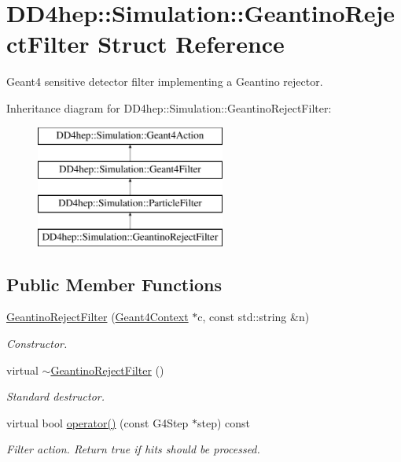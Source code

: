 \hypertarget{struct_d_d4hep_1_1_simulation_1_1_geantino_reject_filter}{}\section{D\+D4hep\+:\+:Simulation\+:\+:Geantino\+Reject\+Filter Struct Reference}
\label{struct_d_d4hep_1_1_simulation_1_1_geantino_reject_filter}


Geant4 sensitive detector filter implementing a Geantino rejector.  


Inheritance diagram for D\+D4hep\+:\+:Simulation\+:\+:Geantino\+Reject\+Filter\+:\begin{figure}[H]
\begin{center}
\leavevmode
\includegraphics[height=4.000000cm]{struct_d_d4hep_1_1_simulation_1_1_geantino_reject_filter}
\end{center}
\end{figure}
\subsection*{Public Member Functions}
\begin{DoxyCompactItemize}
\item 
\hyperlink{struct_d_d4hep_1_1_simulation_1_1_geantino_reject_filter_a1c59ff0c23002a3c6325c3ba74c92f35}{Geantino\+Reject\+Filter} (\hyperlink{class_d_d4hep_1_1_simulation_1_1_geant4_context}{Geant4\+Context} $\ast$c, const std\+::string \&n)
\begin{DoxyCompactList}\small\item\em Constructor. \end{DoxyCompactList}\item 
virtual \hyperlink{struct_d_d4hep_1_1_simulation_1_1_geantino_reject_filter_a566d0c7a2368a3358c321279be8ac3ae}{$\sim$\+Geantino\+Reject\+Filter} ()
\begin{DoxyCompactList}\small\item\em Standard destructor. \end{DoxyCompactList}\item 
virtual bool \hyperlink{struct_d_d4hep_1_1_simulation_1_1_geantino_reject_filter_a6237d315bdb20d7248dc09afc4866a3b}{operator()} (const G4\+Step $\ast$step) const
\begin{DoxyCompactList}\small\item\em Filter action. Return true if hits should be processed. \end{DoxyCompactList}\end{DoxyCompactItemize}
